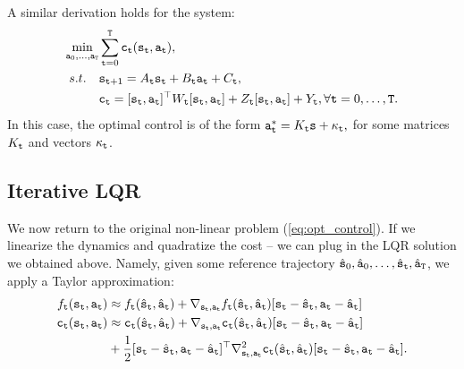 A similar derivation holds for the system:
  \begin{equation*}\label{eq:lqr_full}
    \begin{split}
        \min_{{\tt a}_0,\dots,{\tt a}_{{\tt T}}} & \sum_{{\tt t}=0}^{\tt T} {\tt c}_{\tt t}({\tt s}_{\tt t}, {\tt a}_{\tt t}), \\
        s.t. \quad & {{\tt s}_{{\tt t}+1}} = A_{\tt t} {\tt s}_{\tt t} + B_{\tt t} {\tt a}_{\tt t} + C_{\tt t}, \\
        & {\tt c}_{\tt t} = [{\tt s}_{\tt t}, {\tt a}_{\tt t}]^\top W_{\tt t} [{\tt s}_{\tt t}, {\tt a}_{\tt t}] + Z_{\tt t} [{\tt s}_{\tt t}, {\tt a}_{\tt t}] + Y_{\tt t}, \forall {\tt t}=0,\dots,{\tt T}.
    \end{split}
\end{equation*}
In this case, the optimal control is of the form 
${\tt a}_{\tt t}^* = K_{\tt t} {\tt s} + \kappa_{\tt t}, $ for some matrices $K_{\tt t}$ and vectors  $\kappa_{\tt t}$.



\subsection{Iterative LQR}

We now return to the original non-linear problem (\ref{eq:opt_control}). If we linearize the dynamics and quadratize the cost -- we can plug in the LQR solution we obtained above. Namely, given some reference trajectory $\hat{{\tt s}}_0,\hat{{\tt a}}_0,\dots,\hat{{\tt s}}_{\tt t}, \hat{{\tt a}}_{\tt T}$, we apply a Taylor approximation:
\begin{equation}\label{eq:Taylor_approx}
\begin{split}
    {f_{\tt t}}({{\tt s}_{\tt t}},{{\tt a}_{\tt t}}) &\approx {f_{\tt t}}({\hat{{\tt s}}_{\tt t}},{\hat{{\tt a}}_{\tt t}}) + \nabla_{{\tt s}_{\tt t}, {\tt a}_{\tt t}}f_{\tt t}({\hat{{\tt s}}_{\tt t}},{\hat{{\tt a}}_{\tt t}}) [{\tt s}_{\tt t} - \hat{{\tt s}}_{\tt t}, {\tt a}_{\tt t} - \hat{{\tt a}}_{\tt t}] \\
    {{\tt c}_{\tt t}}({{\tt s}_{\tt t}},{{\tt a}_{\tt t}}) &\approx {{\tt c}_{\tt t}}({\hat{{\tt s}}_{\tt t}},{\hat{{\tt a}}_{\tt t}}) + \nabla_{{\tt s}_{\tt t}, {\tt a}_{\tt t}}{\tt c}_{\tt t}({\hat{{\tt s}}_{\tt t}},{\hat{{\tt a}}_{\tt t}}) [{\tt s}_{\tt t} - \hat{{\tt s}}_{\tt t}, {\tt a}_{\tt t} - \hat{{\tt a}}_{\tt t}] \\
    & + \frac{1}{2} [{\tt s}_{\tt t} - \hat{{\tt s}}_{\tt t}, {\tt a}_{\tt t} - \hat{{\tt a}}_{\tt t}]^\top \nabla^2_{{\tt s}_{\tt t}, {\tt a}_{\tt t}}{\tt c}_{\tt t}({\hat{{\tt s}}_{\tt t}},{\hat{{\tt a}}_{\tt t}}) [{\tt s}_{\tt t} - \hat{{\tt s}}_{\tt t}, {\tt a}_{\tt t} - \hat{{\tt a}}_{\tt t}].
\end{split}
\end{equation}

